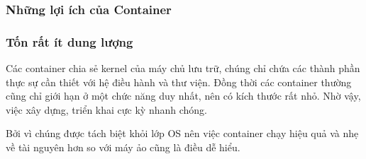 \documentclass[12pt,a4paper]{report}
\begin{document}
		\subsubsection{Những lợi ích của Container}
		\subsubsection{Tốn rất ít dung lượng}
		\hspace{0.6cm}Các container chia sẻ kernel của máy chủ lưu trữ, chúng chỉ chứa các thành phần thực sự cần thiết với hệ điều hành và thư viện. Đồng thời các container thường cũng chỉ giới hạn ở một chức năng duy nhất, nên có kích thước rất nhỏ. Nhờ vậy, việc xây dựng, triển khai cực kỳ nhanh chóng.
		
		Bởi vì chúng được tách biệt khỏi lớp OS nên việc container chạy hiệu quả và nhẹ về tài nguyên hơn so với máy ảo cũng là điều dễ hiểu.
\end{document}
